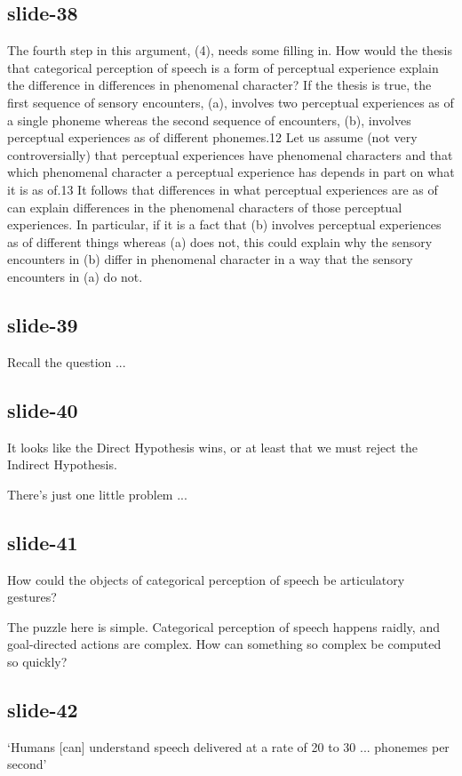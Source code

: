 \documentclass[12pt,\papersize]{extarticle}
\begin{document}
\subsection{slide-38}
The fourth step in this argument, (4), needs some filling in. How would the thesis that categorical
perception of speech is a form of perceptual experience explain the difference in differences in
phenomenal character? If the thesis is true, the first sequence of sensory encounters, (a), involves
two perceptual experiences as of a single phoneme whereas the second sequence of encounters, (b),
involves perceptual experiences as of different phonemes.12 Let us assume (not very controversially)
that perceptual experiences have phenomenal characters and that which phenomenal character a
perceptual experience has depends in part on what it is as of.13 It follows that differences in what
perceptual experiences are as of can explain differences in the phenomenal characters of those
perceptual experiences. In particular, if it is a fact that (b) involves perceptual experiences as
of different things whereas (a) does not, this could explain why the sensory encounters in (b)
differ in phenomenal character in a way that the sensory encounters in (a) do not.

\subsection{slide-39}
Recall the question ...

\subsection{slide-40}
It looks like the Direct Hypothesis wins, or at least that we must reject the
Indirect Hypothesis.

There’s just one little problem ...

\subsection{slide-41}
How could the objects of categorical perception of speech be articulatory gestures?

The puzzle here is simple.
Categorical perception of speech happens raidly, and goal-directed actions
are complex.  How can something so complex be computed so quickly?

\subsection{slide-42}
‘Humans [can] understand speech delivered at a rate of 20 to 30 ... phonemes per second’
\citep{Devlin:2006qg}
\end{document}
